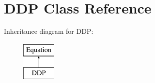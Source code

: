 \hypertarget{class_open_chams_1_1_d_d_p}{}\section{D\+DP Class Reference}
\label{class_open_chams_1_1_d_d_p}
Inheritance diagram for D\+DP\+:\begin{figure}[H]
\begin{center}
\leavevmode
\includegraphics[height=2.000000cm]{class_open_chams_1_1_d_d_p}
\end{center}
\end{figure}
